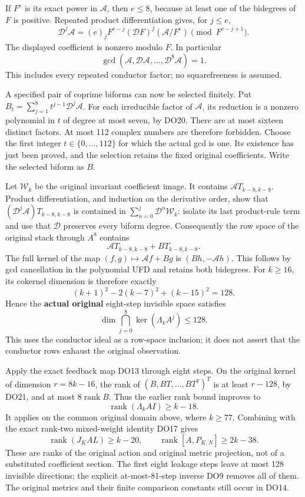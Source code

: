 \documentclass[11pt]{article}
\begin{document}
If \(F^e\) is its exact power in \(\mathcal A\), then \(e\le8\), because at least one of the bidegrees of \(F\) is positive. Repeated product differentiation gives, for \(j\le e\), \[
\mathcal D^j\mathcal A
=(e)_{\underline j}F^{e-j}(\mathcal DF)^j(\mathcal A/F^e)
\pmod {F^{e-j+1}}.
\] The displayed coefficient is nonzero modulo \(F\). In particular \[
\gcd(\mathcal A,\mathcal D\mathcal A,\ldots,\mathcal D^8\mathcal A)=1.
\tag{DO20}
\] This includes every repeated conductor factor; no squarefreeness is assumed.

A specified pair of coprime biforms can now be selected finitely. Put \(B_t=\sum_{j=1}^8t^{j-1}\mathcal D^j\mathcal A\). For each irreducible factor of \(\mathcal A\), its reduction is a nonzero polynomial in \(t\) of degree at most seven, by DO20. There are at most sixteen distinct factors. At most 112 complex numbers are therefore forbidden. Choose the first integer \(t\in\{0,\ldots,112\}\) for which the actual gcd is one. Its existence has just been proved, and the selection retains the fixed original coefficients. Write the selected biform as \(B\).

Let \(\mathcal W_k\) be the original invariant coefficient image. It contains \(\mathcal A T_{k-8,k-8}\). Product differentiation, and induction on the derivative order, show that \((\mathcal D^j\mathcal A)T_{k-8,k-8}\) is contained in \(\sum_{n=0}^j\mathcal D^n\mathcal W_k\): isolate its last product-rule term and use that \(\mathcal D\) preserves every biform degree. Consequently the row space of the original stack through \(A^8\) contains \[
\mathcal A T_{k-8,k-8}+B T_{k-8,k-8}.
\] The full kernel of the map \((f,g)\mapsto\mathcal Af+Bg\) is \((Bh,-\mathcal Ah)\). This follows by gcd cancellation in the polynomial UFD and retains both bidegrees. For \(k\ge16\), its cokernel dimension is therefore exactly \[
(k+1)^2-2(k-7)^2+(k-15)^2=128.
\] Hence the \textbf{actual original} eight-step invisible space satisfies \[
\boxed{\displaystyle
\dim\bigcap_{j=0}^8\ker(\Lambda_k A^j)\le128.}
\tag{DO21}
\] This uses the conductor ideal as a row-space inclusion; it does not assert that the conductor rows exhaust the original observation.

Apply the exact feedback map DO13 through eight steps. On the original kernel of dimension \(r=8k-16\), the rank of \((B,BT,\ldots,BT^7)^T\) is at least \(r-128\), by DO21, and at most \(8\operatorname{rank}B\). Thus the earlier rank bound improves to \[
\boxed{\displaystyle
\operatorname{rank}(\Lambda_k AI)\ge k-18.}
\tag{DO22}
\] It applies on the common original domain above, where \(k\ge77\). Combining with the exact rank-two mixed-weight identity DO17 gives \[
\boxed{\displaystyle
\operatorname{rank}(J_KAL)\ge k-20,\qquad
\operatorname{rank}[A,P_{K,N}]\ge2k-38.}
\tag{DO23}
\] These are ranks of the original action and original metric projection, not of a substituted coefficient section. The first eight leakage steps leave at most 128 invisible directions; the explicit at-most-81-step inverse DO9 removes all of them. The original metrics and their finite comparison constants still occur in DO14.
\end{document}
